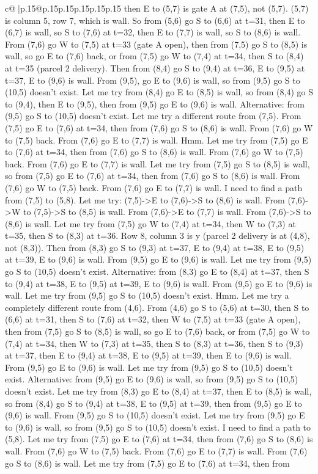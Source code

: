 \documentclass{article}
\begin{document}
{\begin{supertabular}{c@{$\;$}|p{.15\linewidth}@{}p{.15\linewidth}p{.15\linewidth}p{.15\linewidth}p{.15\linewidth}p{.15\linewidth}}
{{{then E to (5,7) is gate A at (7,5), not (5,7). (5,7) is column 5, row 7, which is wall. So from (5,6) go S to (6,6) at t=31, then E to (6,7) is wall, so S to (7,6) at t=32, then E to (7,7) is wall, so S to (8,6) is wall. From (7,6) go W to (7,5) at t=33 (gate A open), then from (7,5) go S to (8,5) is wall, so go E to (7,6) back, or from (7,5) go W to (7,4) at t=34, then S to (8,4) at t=35 (parcel 2 delivery). Then from (8,4) go S to (9,4) at t=36, E to (9,5) at t=37, E to (9,6) is wall. From (9,5), go E to (9,6) is wall, so from (9,5) go S to (10,5) doesn't exist. Let me try from (8,4) go E to (8,5) is wall, so from (8,4) go S to (9,4), then E to (9,5), then from (9,5) go E to (9,6) is wall. Alternative: from (9,5) go S to (10,5) doesn't exist. Let me try a different route from (7,5). From (7,5) go E to (7,6) at t=34, then from (7,6) go S to (8,6) is wall. From (7,6) go W to (7,5) back. From (7,6) go E to (7,7) is wall. Hmm. Let me try from (7,5) go E to (7,6) at t=34, then from (7,6) go S to (8,6) is wall. From (7,6) go W to (7,5) back. From (7,6) go E to (7,7) is wall. Let me try from (7,5) go S to (8,5) is wall, so from (7,5) go E to (7,6) at t=34, then from (7,6) go S to (8,6) is wall. From (7,6) go W to (7,5) back. From (7,6) go E to (7,7) is wall. I need to find a path from (7,5) to (5,8). Let me try: (7,5){-}>E to (7,6){-}>S to (8,6) is wall. From (7,6){-}>W to (7,5){-}>S to (8,5) is wall. From (7,6){-}>E to (7,7) is wall. From (7,6){-}>S to (8,6) is wall. Let me try from (7,5) go W to (7,4) at t=34, then W to (7,3) at t=35, then S to (8,3) at t=36. Row 8, column 3 is y (parcel 2 delivery is at (4,8), not (8,3)). Then from (8,3) go S to (9,3) at t=37, E to (9,4) at t=38, E to (9,5) at t=39, E to (9,6) is wall. From (9,5) go E to (9,6) is wall. Let me try from (9,5) go S to (10,5) doesn't exist. Alternative: from (8,3) go E to (8,4) at t=37, then S to (9,4) at t=38, E to (9,5) at t=39, E to (9,6) is wall. From (9,5) go E to (9,6) is wall. Let me try from (9,5) go S to (10,5) doesn't exist. Hmm. Let me try a completely different route from (4,6). From (4,6) go S to (5,6) at t=30, then S to (6,6) at t=31, then S to (7,6) at t=32, then W to (7,5) at t=33 (gate A open), then from (7,5) go S to (8,5) is wall, so go E to (7,6) back, or from (7,5) go W to (7,4) at t=34, then W to (7,3) at t=35, then S to (8,3) at t=36, then S to (9,3) at t=37, then E to (9,4) at t=38, E to (9,5) at t=39, then E to (9,6) is wall. From (9,5) go E to (9,6) is wall. Let me try from (9,5) go S to (10,5) doesn't exist. Alternative: from (9,5) go E to (9,6) is wall, so from (9,5) go S to (10,5) doesn't exist. Let me try from (8,3) go E to (8,4) at t=37, then E to (8,5) is wall, so from (8,4) go S to (9,4) at t=38, E to (9,5) at t=39, then from (9,5) go E to (9,6) is wall. From (9,5) go S to (10,5) doesn't exist. Let me try from (9,5) go E to (9,6) is wall, so from (9,5) go S to (10,5) doesn't exist. I need to find a path to (5,8). Let me try from (7,5) go E to (7,6) at t=34, then from (7,6) go S to (8,6) is wall. From (7,6) go W to (7,5) back. From (7,6) go E to (7,7) is wall. From (7,6) go S to (8,6) is wall. Let me try from (7,5) go E to (7,6) at t=34, then from }}}
\end{supertabular}}
\end{document}
